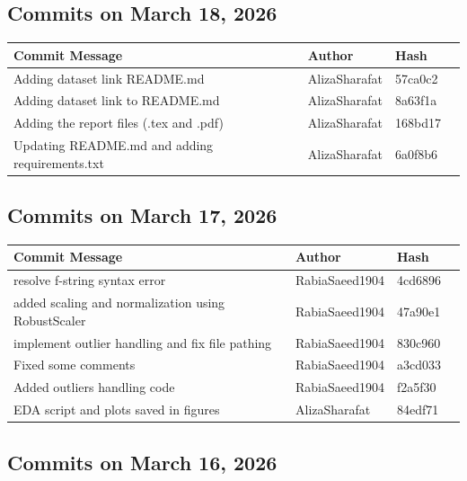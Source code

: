 \documentclass[12pt, a4paper]{article}
\begin{document}
\subsection*{Commits on March 18, 2026}

\begin{table}[H]
\centering
\small
\begin{tabular}{llll}
\toprule
\textbf{Commit Message} & \textbf{Author} & \textbf{Hash} \\
\midrule
Adding dataset link README.md & AlizaSharafat & 57ca0c2 \\
Adding dataset link to README.md & AlizaSharafat & 8a63f1a \\
Adding the report files (.tex and .pdf) & AlizaSharafat & 168bd17 \\
Updating README.md and adding requirements.txt & AlizaSharafat & 6a0f8b6 \\
\bottomrule
\end{tabular}
\end{table}

\subsection*{Commits on March 17, 2026}

\begin{table}[H]
\centering
\small
\begin{tabular}{llll}
\toprule
\textbf{Commit Message} & \textbf{Author} & \textbf{Hash} \\
\midrule
resolve f-string syntax error & RabiaSaeed1904 & 4cd6896 \\
added scaling and normalization using RobustScaler & RabiaSaeed1904 & 47a90e1 \\
implement outlier handling and fix file pathing & RabiaSaeed1904 & 830c960 \\
Fixed some comments & RabiaSaeed1904 & a3cd033 \\
Added outliers handling code & RabiaSaeed1904 & f2a5f30 \\
EDA script and plots saved in figures & AlizaSharafat & 84edf71 \\
\bottomrule
\end{tabular}
\end{table}

\subsection*{Commits on March 16, 2026}
\end{document}
